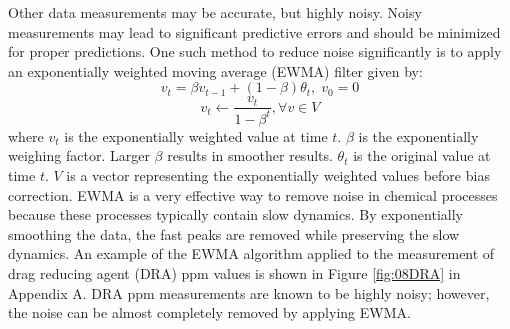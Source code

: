 Other data measurements may be accurate, but highly noisy. Noisy measurements may lead to significant predictive errors and should be minimized for proper predictions.  One such method to reduce noise significantly is to apply an exponentially weighted moving average (EWMA) filter given by:
\begin{equation}
    v_t = \beta v_{t - 1} + (1 - \beta) \theta_t, \; v_0 = 0
    \label{eq:08EWMA}
\end{equation}
\begin{equation}
    v_t \leftarrow \frac{v_t}{1 - \beta^t}, \forall v \in V
    \label{eq:08Bias_Correction}
\end{equation}
where $v_{t}$ is the exponentially weighted value at time $t$.  $\beta$ is the exponentially weighing factor.  Larger $\beta$ results in smoother results.  $\theta_t$ is the original value at time $t$. $V$ is a vector representing the exponentially weighted values before bias correction. EWMA is a very effective way to remove noise in chemical processes because these processes typically contain slow dynamics. By exponentially smoothing the data, the fast peaks are removed while preserving the slow dynamics. An example of the EWMA algorithm applied to the measurement of drag reducing agent (DRA) ppm values is shown in Figure \ref{fig:08DRA} in Appendix A.  DRA ppm measurements are known to be highly noisy; however, the noise can be almost completely removed by applying EWMA.

